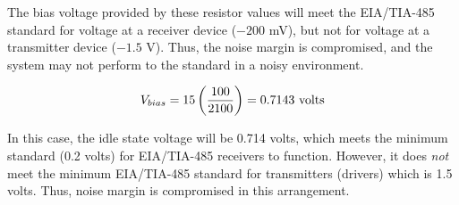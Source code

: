 





The bias voltage provided by these resistor values will meet the EIA/TIA-485 standard for voltage at a receiver device ($-200$ mV), but not for voltage at a transmitter device ($-1.5$ V).  Thus, the noise margin is compromised, and the system may not perform to the standard in a noisy environment.







$$V_{bias} = 15 \left(100 \over {2100} \right) = 0.7143 \hbox{ volts}$$

In this case, the idle state voltage will be 0.714 volts, which meets the minimum standard (0.2 volts) for EIA/TIA-485 receivers to function.  However, it does {\it not} meet the minimum EIA/TIA-485 standard for transmitters (drivers) which is 1.5 volts.  Thus, noise margin is compromised in this arrangement.




